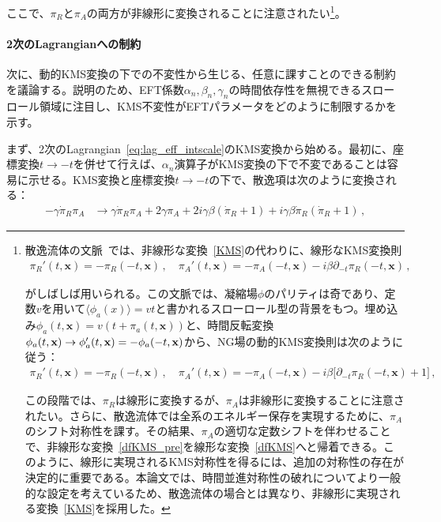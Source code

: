 ここで、$\pi_R$と$\pi_A$の両方が非線形に変換されることに注意されたい\footnote{散逸流体の文脈~\cite{Glorioso:2017fpd}では、非線形な変換~\eqref{KMS}の代わりに、線形なKMS変換則
\begin{align}
\label{dfKMS}
\pi_R'(t,\mathbf x) =-\pi_R(-t,\mathbf x)
 \,,
 \quad
 \pi_A'(t,\mathbf x) = 
 -\pi_A(-t,\mathbf x) 
 - i\beta \partial_{-t} \pi_R(-t,\mathbf x)\,,
\end{align}

がしばしば用いられる。この文脈では、凝縮場$\phi$のパリティは奇であり、定数$v$を用いて$\langle\phi_a(x)\rangle=vt$と書かれるスローロール型の背景をもつ。埋め込み$\phi_a(t,\mathbf x)=v(t+\pi_a(t,\mathbf x))$と、時間反転変換$\phi_a(t,{\bf x})\to\phi_a'(t,{\bf x})=-\phi_a(-t,{\bf x})$から、NG場の動的KMS変換則は次のように従う：
\begin{align}
\label{dfKMS_pre}
 \pi_R'(t,\mathbf x) =-\pi_R(-t,\mathbf x)
 \,,
 \quad
 \pi_A'(t,\mathbf x) = 
 -\pi_A(-t,\mathbf x) 
 - i\beta \big[\partial_{-t} \pi_R(-t,\mathbf x)+1\big]\,,
\end{align}

この段階では、$\pi_R$は線形に変換するが、$\pi_A$は非線形に変換することに注意されたい。さらに、散逸流体では全系のエネルギー保存を実現するために、$\pi_A$のシフト対称性を課す。その結果、$\pi_A$の適切な定数シフトを伴わせることで、非線形な変換~\eqref{dfKMS_pre}を線形な変換~\eqref{dfKMS}へと帰着できる。このように、線形に実現されるKMS対称性を得るには、追加の対称性の存在が決定的に重要である。本論文では、時間並進対称性の破れについてより一般的な設定を考えているため、散逸流体の場合とは異なり、非線形に実現される変換~\eqref{KMS}を採用した。}。

\paragraph{2次のLagrangianへの制約}

次に、動的KMS変換の下での不変性から生じる、任意に課すことのできる制約を議論する。説明のため、EFT係数$\alpha_n, \beta_n, \gamma_n$の時間依存性を無視できるスローロール領域に注目し、KMS不変性がEFTパラメータをどのように制限するかを示す。

\medskip
まず、2次のLagrangian~\eqref{eq:lag_eff_intscale}のKMS変換から始める。最初に、座標変換$t\to-t$を併せて行えば、$\alpha_n$演算子がKMS変換の下で不変であることは容易に示せる。KMS変換と座標変換$t\to-t$の下で、散逸項は次のように変換される：
\begin{align}
 -\gamma\dot{\pi}_R\pi_A 
 &\to \gamma\dot{\pi}_R\pi_A 
 +2\gamma\pi_A+2i\gamma\beta(\dot{\pi}_R+1)
 + i\gamma\beta\dot{\pi}_R(\dot{\pi}_R+1)\,,
\end{align}

